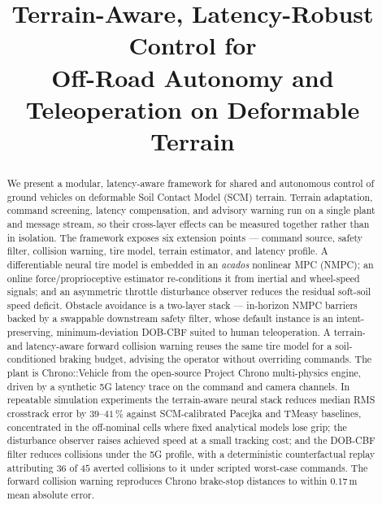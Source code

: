 \documentclass[conference,letterpaper,10pt]{IEEEtran}
\title{Terrain-Aware, Latency-Robust Control for\\
       Off-Road Autonomy and Teleoperation on Deformable Terrain}
\author{%
  \IEEEauthorblockN{Kyle Sha, Zhenhao Zhou, Radu Serban, Dan Negrut}
  \IEEEauthorblockA{Department of Mechanical Engineering,
    University of Wisconsin--Madison\\
    1513 University Ave., Madison, WI 53706, USA\\
    Email: \{kasha2, zzhou292, serban, negrut\}@wisc.edu}}
\begin{document}
\maketitle
\makeatletter
\def\@textbottom{\vskip\z@\@plus.0001fil}%
\let\@texttop\relax
\makeatother
\raggedbottom
\setlength{\textfloatsep}{6pt plus 2pt minus 1pt}
\setlength{\floatsep}{6pt plus 2pt minus 1pt}
\setlength{\dbltextfloatsep}{6pt plus 2pt minus 1pt}
\setlength{\dblfloatsep}{6pt plus 2pt minus 1pt}

\begin{abstract}
We present a modular, latency-aware framework for shared and autonomous
control of ground vehicles on deformable Soil Contact Model (SCM)
terrain. Terrain adaptation, command screening, latency compensation,
and advisory warning run on a single plant and message stream, so their
cross-layer effects can be measured together rather than in isolation.
The framework exposes six extension points --- command source, safety
filter, collision warning, tire model, terrain estimator, and latency
profile. A differentiable neural tire model is embedded in an
\emph{acados} nonlinear MPC (NMPC); an online force/proprioceptive
estimator re-conditions it from inertial and wheel-speed signals; and an
asymmetric throttle disturbance observer reduces the residual soft-soil
speed deficit. Obstacle avoidance is a two-layer stack --- in-horizon
NMPC barriers backed by a swappable downstream safety filter, whose
default instance is an intent-preserving, minimum-deviation DOB-CBF
suited to human teleoperation. A terrain- and latency-aware forward
collision warning reuses the same tire model for a soil-conditioned
braking budget, advising the operator without overriding commands. The
plant is Chrono::Vehicle from the open-source Project Chrono multi-physics
engine, driven by a synthetic 5G
latency trace on the command and camera channels. In repeatable
simulation experiments the terrain-aware neural stack reduces median RMS
crosstrack error by $39$--$41\,\%$ against SCM-calibrated Pacejka and
TMeasy baselines, concentrated in the off-nominal cells where fixed
analytical models lose grip; the disturbance observer raises achieved
speed at a small tracking cost; and the DOB-CBF filter reduces collisions
under the 5G profile, with a deterministic counterfactual replay
attributing $36$ of $45$ averted collisions to it under scripted
worst-case commands. The forward collision warning reproduces Chrono
brake-stop distances to within $0.17\,\mathrm{m}$ mean absolute error.
\end{abstract}
\end{document}
